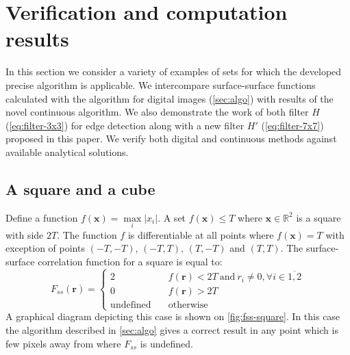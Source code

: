 \documentclass[reprint,amsmath,amssymb,aps,pre,showkeys,showpacs]{revtex4-1}
\begin{document}
\section{Verification and computation results}
\label{sec:results}
In this section we consider a variety of examples of sets for which the developed
precise algorithm is applicable. We intercompare surface-surface functions
calculated with the algorithm for digital images (\cref{sec:algo}) with results
of the novel continuous algorithm. We also demonstrate the work of both filter
$H$ (\ref{eq:filter-3x3}) for edge detection along with a new filter $H'$
(\ref{eq:filter-7x7}) proposed in this paper. We verify both digital and
continuous methods against available analytical solutions.

\subsection{A square and a cube}
Define a function $f(\bm{x}) = \max\limits_i |x_i|$. A set $f(\bm{x}) \le T$
where $\bm{x} \in \mathbb{R}^2$ is a square with side $2T$. The function $f$ is
differentiable at all points where $f(\bm{x}) = T$ with exception of points
$(-T, -T)$, $(-T, T)$, $(T, -T)$ and $(T, T)$. The surface-surface correlation
function for a square is equal to:
\begin{equation*}
  F_{ss}(\bm{r}) = \left\{
  \begin{array}{ll}
    2 & \quad f(\bm{r}) < 2T \ \text{and}\ r_i \ne 0, \forall i \in \overline{1,2} \\
    0 & \quad f(\bm{r}) > 2T \\
    \text{undefined} & \quad \text{otherwise}
  \end{array}
  \right.
\end{equation*}
A graphical diagram depicting this case is shown on \cref{fig:fss-square}. In
this case the algorithm described in \cref{sec:algo} gives a correct result in
any point which is few pixels away from where $F_{ss}$ is undefined.
\end{document}
